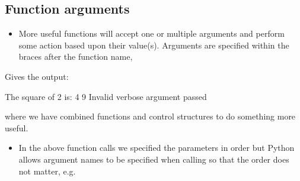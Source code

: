 \documentclass[letterpaper,10pt,english,openany]{sphinxmanual}
\begin{document}
\subsection{Function arguments}
\label{\detokenize{introduction_to_python/working_with_functions:function-arguments}}\begin{itemize}
\item {} 
More useful functions will accept one or multiple arguments and
perform some action based upon their value(s). Arguments are
specified within the braces after the function name,

\end{itemize}

\begin{sphinxVerbatim}[commandchars=\\\{\}]
  
       
               
       

   
  
      
\end{sphinxVerbatim}

Gives the output:

\begin{sphinxVerbatim}[commandchars=\\\{\}]
The square of 2 is: 4
9
Invalid verbose argument passed
\end{sphinxVerbatim}

where we have combined functions and control structures to do something
more useful.
\begin{itemize}
\item {} 
In the above function calls we specified the parameters in order but
Python allows argument names to be specified when calling so that the
order does not matter, e.g.

\end{itemize}
\end{document}

